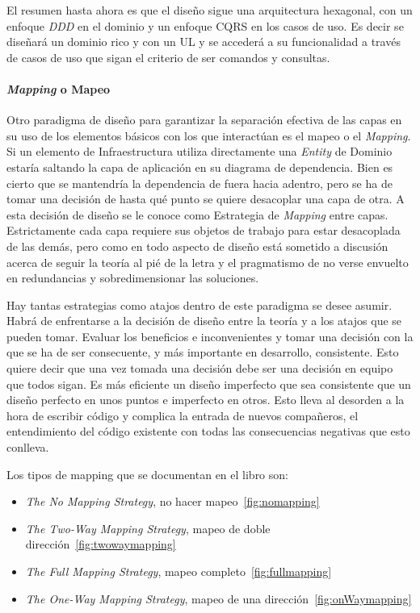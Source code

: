 El resumen hasta ahora es que el diseño sigue una arquitectura hexagonal, con un enfoque \textit{DDD} en el dominio y un enfoque CQRS en los casos de uso.
Es decir se diseñará un dominio rico y con un UL y se accederá a su funcionalidad a través de casos de uso que sigan el criterio de ser comandos y consultas.

\paragraph{\textit{Mapping} o Mapeo}

Otro paradigma de diseño para garantizar la separación efectiva de las capas en su uso de los elementos básicos con los que interactúan es el mapeo o el \textit{Mapping}.
Si un elemento de Infraestructura utiliza directamente una \textit{Entity} de Dominio estaría saltando la capa de aplicación en su diagrama de dependencia.
Bien es cierto que se mantendría la dependencia de fuera hacia adentro, pero se ha de tomar una decisión de hasta qué punto se quiere desacoplar una capa de otra.
A esta decisión de diseño se le conoce como Estrategia de \textit{Mapping} entre capas.
Estrictamente cada capa requiere sus objetos de trabajo para estar desacoplada de las demás, pero como en todo aspecto de diseño está sometido a discusión acerca de seguir la teoría al pié de la letra y el pragmatismo de no verse envuelto en redundancias y sobredimensionar las soluciones.

Hay tantas estrategias como atajos dentro de este paradigma se desee asumir.
Habrá de enfrentarse a la decisión de diseño entre la teoría y a los atajos que se pueden tomar.
Evaluar los beneficios e inconvenientes y tomar una decisión con la que se ha de ser consecuente, y más importante en desarrollo, consistente.
Esto quiere decir que una vez tomada una decisión debe ser una decisión en equipo que todos sigan.
Es más eficiente un diseño imperfecto que sea consistente que un diseño perfecto en unos puntos e imperfecto en otros.
Esto lleva al desorden a la hora de escribir código y complica la entrada de nuevos compañeros, el entendimiento del código existente con todas las consecuencias negativas que esto conlleva.

Los tipos de mapping que se documentan en el libro\cite{TomHombergs2019GYHD} son:
\begin{itemize}
    \item \textit{The No Mapping Strategy}, no hacer mapeo~\cref{fig:nomapping}
    \item \textit{The Two-Way Mapping Strategy}, mapeo de doble dirección~\cref{fig:twowaymapping}
    \item \textit{The Full Mapping Strategy}, mapeo completo~\cref{fig:fullmapping}
    \item \textit{The One-Way Mapping Strategy}, mapeo de una dirección~\cref{fig:onWaymapping}
\end{itemize}

